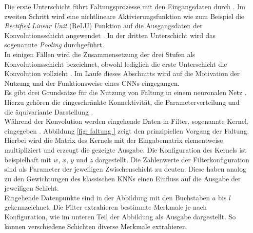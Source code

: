 		Die erste Unterschicht führt Faltungsprozesse mit den Eingangsdaten durch \cite{deeplearning}. Im zweiten Schritt wird eine nichtlineare Aktivierungsfunktion wie zum Beispiel die \textit{Rectified Linear Unit} (ReLU) Funktion auf die Ausgangsdaten der Konvolutionsschicht angewendet \cite{deeplearning}. In der dritten Unterschicht wird das sogenannte \textit{Pooling} durchgeführt.\\
		
		In einigen Fällen wird die Zusammensetzung der drei Stufen als Konvolutionsschicht bezeichnet, obwohl lediglich die erste Unterschicht die Konvolution vollzieht \cite{deeplearning}. Im Laufe dieses Abschnitts wird auf die Motivation der Nutzung und der Funktionsweise eines CNNs eingegangen.\\
		
		Es gibt drei Grundsätze für die Nutzung von Faltung in einem neuronalen Netz \cite{deeplearning}. Hierzu gehören die eingeschränkte Konnektivität, die Parameterverteilung und die äquivariante Darstellung \cite{deeplearning}.\\
		
			Während der Konvolution werden eingehende Daten in Filter, sogenannte Kernel, eingegeben \cite{deeplearning}. Abbildung \ref{fig: faltung } zeigt den prinzipiellen Vorgang der Faltung. Hierbei wird die Matrix des Kernels mit der Eingabematrix elementweise multipliziert und erzeugt die gezeigte Ausgabe. Die Konfiguration des Kernels ist beispielhaft mit $w$, $x$, $y$ und $z$ dargestellt. Die Zahlenwerte der Filterkonfiguration sind als Parameter der jeweiligen Zwischenschicht zu deuten. Diese haben analog zu den Gewichtungen des klassischen KNNs einen Einfluss auf die Ausgabe der jeweiligen Schicht.\\
			
				Eingehende Datenpunkte sind in der Abbildung mit den Buchstaben $a$ bis $l$ gekennzeichnet. Die Filter extrahieren bestimmte Merkmale je nach Konfiguration, wie im unteren Teil der Abbildung als Ausgabe dargestellt. So können verschiedene Schichten diverse Merkmale extrahieren.\\
			
